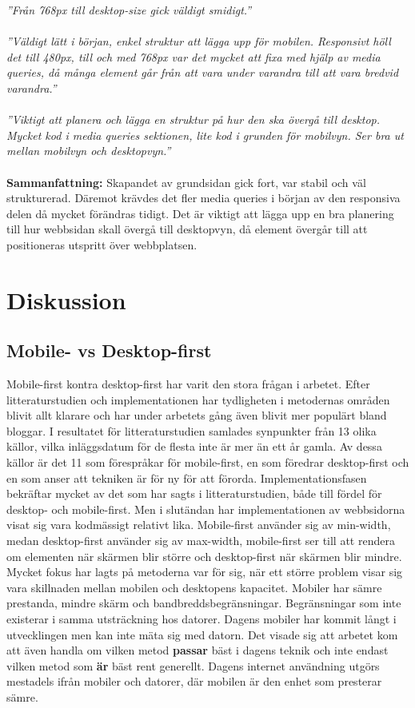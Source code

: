 \documentclass[11pt]{article}
\begin{document}
\textit{”Från 768px till desktop-size gick väldigt smidigt.”}\\\\
\textit{”Väldigt lätt i början, enkel struktur att lägga upp för mobilen. Responsivt höll det till 480px, till och med 768px var det mycket att fixa med hjälp av media queries, då många element går från att vara under varandra till att vara bredvid varandra.”}\\\\
\textit{”Viktigt att planera och lägga en struktur på hur den ska övergå till desktop. Mycket kod i media queries sektionen, lite kod i grunden för mobilvyn.  Ser bra ut mellan mobilvyn och desktopvyn.”}\\\\
\textbf{Sammanfattning:} Skapandet av grundsidan gick fort, var stabil och väl strukturerad. Däremot krävdes det fler media queries i början av den responsiva delen då mycket förändras tidigt. Det är viktigt att lägga upp en bra planering till hur webbsidan skall övergå till desktopvyn, då element övergår till att positioneras utspritt över webbplatsen.



\section{Diskussion}
\subsection{Mobile- vs Desktop-first}
Mobile-first kontra desktop-first har varit den stora frågan i arbetet. Efter litteraturstudien och implementationen har tydligheten i metodernas områden blivit allt klarare och har under arbetets gång även blivit mer populärt bland bloggar. I resultatet för litteraturstudien samlades synpunkter från 13 olika källor, vilka inläggsdatum för de flesta inte är mer än ett år gamla. Av dessa källor är det 11 som förespråkar för mobile-first, en som föredrar desktop-first och en som anser att tekniken är för ny för att förorda. Implementationsfasen bekräftar mycket av det som har sagts i litteraturstudien, både till fördel för desktop- och mobile-first. Men i slutändan har implementationen av webbsidorna visat sig vara kodmässigt relativt lika. Mobile-first använder sig av min-width, medan desktop-first använder sig av max-width, mobile-first ser till att rendera om elementen när skärmen blir större och desktop-first när skärmen blir mindre.
Mycket fokus har lagts på metoderna var för sig, när ett större problem visar sig vara skillnaden mellan mobilen och desktopens kapacitet. Mobiler har sämre prestanda, mindre skärm och bandbreddsbegränsningar. Begränsningar som inte existerar i samma utsträckning hos datorer. Dagens mobiler har kommit långt i utvecklingen men kan inte mäta sig med datorn. Det visade sig att arbetet kom att även handla om vilken metod \textbf{passar} bäst i dagens teknik och inte endast vilken metod som \textbf{är} bäst rent generellt. Dagens internet användning utgörs mestadels ifrån mobiler och datorer, där mobilen är den enhet som presterar sämre. 
\end{document}
